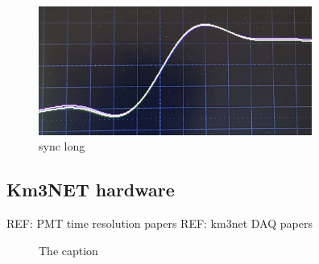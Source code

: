 \begin{figure} %
    \includegraphics[width=0.8\textwidth]{diagrams/5-daq/sync.jpg}
    \caption[sync short]
    {sync long}
    \label{fig:sync}
\end{figure}

\subsection{Km3NET hardware} %
\label{sec:daq_hard_km3net} %

REF: PMT time resolution papers
REF: km3net DAQ papers

\begin{figure} %
    \centering
    \quad
    \caption[The caption]
    {The caption}
\end{figure}

